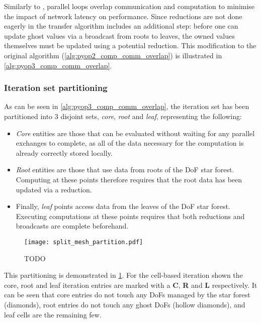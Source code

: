 \documentclass[thesis]{subfiles}
\begin{document}
Similarly to ,  parallel loops overlap communication and computation to minimise the impact of network latency on performance.
Since reductions are not done eagerly in  the transfer algorithm includes an additional step: before one can update ghost values via a broadcast from roots to leaves, the owned values themselves must be updated using a potential reduction.
This modification to the original  algorithm (\cref{alg:pyop2_comp_comm_overlap}) is illustrated in \cref{alg:pyop3_comp_comm_overlap}.


\subsubsection{Iteration set partitioning}

As can be seen in \cref{alg:pyop3_comp_comm_overlap}, the iteration set has been partitioned into 3 disjoint sets, \textit{core}, \textit{root} and \textit{leaf}, representing the following:

\begin{itemize}
  \item
    \textit{Core} entities are those that can be evaluated without waiting for any parallel exchanges to complete, as all of the data necessary for the computation is already correctly stored locally.

  \item
    \textit{Root} entities are those that use data from roots of the DoF star forest.
    Computing at these points therefore requires that the root data has been updated via a reduction.

  \item
    Finally, \textit{leaf} points access data from the leaves of the DoF star forest.
    Executing computations at these points requires that both reductions and broadcasts are complete beforehand.
\end{itemize}

\begin{figure}
  \centering
  \texttt{[image: split\_mesh\_partition.pdf]}
  \caption{TODO}
  \label{fig:split_mesh_partition}
\end{figure}

This partitioning is demonstrated in \cref{fig:split_mesh_partition}.
For the cell-based iteration shown the core, root and leaf iteration entries are marked with a \textbf{C}, \textbf{R} and \textbf{L} respectively.
It can be seen that core entries do not touch any DoFs managed by the star forest (diamonds), root entries do not touch any ghost DoFs (hollow diamonds), and leaf cells are the remaining few.
\end{document}
